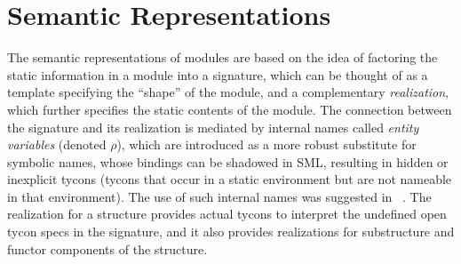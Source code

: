 \documentclass[9pt,nocopyrightspace, fleqn]{sigplanconf}
\begin{document}

\section{Semantic Representations}
The semantic representations of modules are based on the idea of
factoring the static information in a module into a signature, which
can be thought of as a template specifying the ``shape'' of the
module, and a complementary \emph{realization}, which further
specifies the static contents of the module. The connection between
the signature and its realization is mediated by internal names called
\emph{entity variables} (denoted $\rho$), which are introduced as a more robust
substitute for symbolic names, whose bindings can be shadowed in SML,
resulting in hidden or inexplicit tycons (tycons that occur in a static
environment but are not nameable in that environment). The use of
such internal names was suggested in ~\cite{lillibridge94}.
The realization for a structure provides actual tycons to interpret
the undefined open tycon specs in the signature, and it also provides
realizations for substructure and functor components of the structure.
\end{document}
